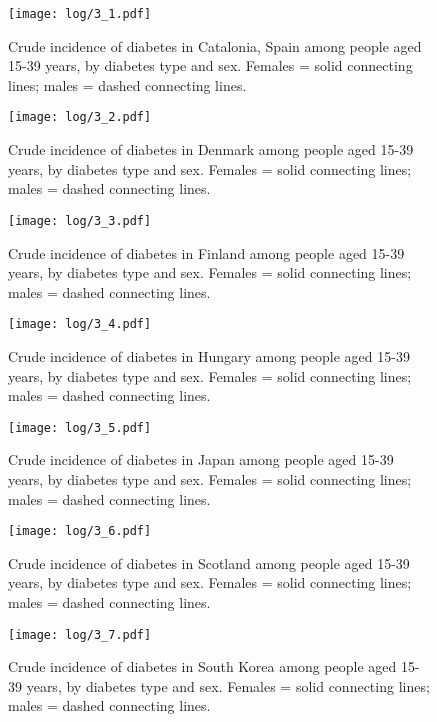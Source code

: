 \documentclass[11pt]{article}
\begin{document}
\begin{figure}
    \centering
    \texttt{[image: log/3\_1.pdf]}
    \caption{Crude incidence of diabetes in Catalonia, Spain among people aged 15-39 years, by diabetes type and sex. Females = solid connecting lines; males = dashed connecting lines.}
    \label{Catalonia, Spaincrude}
\end{figure}
\begin{figure}
    \centering
    \texttt{[image: log/3\_2.pdf]}
    \caption{Crude incidence of diabetes in Denmark among people aged 15-39 years, by diabetes type and sex. Females = solid connecting lines; males = dashed connecting lines.}
    \label{Denmarkcrude}
\end{figure}
\begin{figure}
    \centering
    \texttt{[image: log/3\_3.pdf]}
    \caption{Crude incidence of diabetes in Finland among people aged 15-39 years, by diabetes type and sex. Females = solid connecting lines; males = dashed connecting lines.}
    \label{Finlandcrude}
\end{figure}
\begin{figure}
    \centering
    \texttt{[image: log/3\_4.pdf]}
    \caption{Crude incidence of diabetes in Hungary among people aged 15-39 years, by diabetes type and sex. Females = solid connecting lines; males = dashed connecting lines.}
    \label{Hungarycrude}
\end{figure}
\begin{figure}
    \centering
    \texttt{[image: log/3\_5.pdf]}
    \caption{Crude incidence of diabetes in Japan among people aged 15-39 years, by diabetes type and sex. Females = solid connecting lines; males = dashed connecting lines.}
    \label{Japancrude}
\end{figure}
\begin{figure}
    \centering
    \texttt{[image: log/3\_6.pdf]}
    \caption{Crude incidence of diabetes in Scotland among people aged 15-39 years, by diabetes type and sex. Females = solid connecting lines; males = dashed connecting lines.}
    \label{Scotlandcrude}
\end{figure}
\begin{figure}
    \centering
    \texttt{[image: log/3\_7.pdf]}
    \caption{Crude incidence of diabetes in South Korea among people aged 15-39 years, by diabetes type and sex. Females = solid connecting lines; males = dashed connecting lines.}
    \label{South Koreacrude}
\end{figure}
\begin{stlog}\end{stlog}
\color{black}
\clearpage
\end{document}
